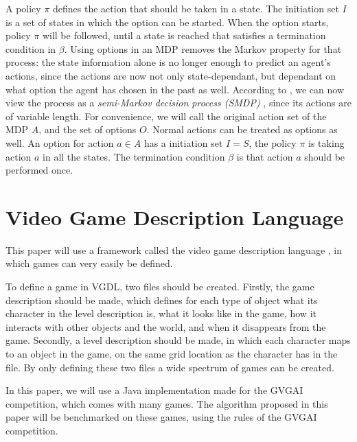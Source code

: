 A policy $\pi$ defines the action that should be taken in a state. The
initiation set $I$ is a set of states in which the option can be started. When the
option starts, policy $\pi$ will be followed, until a state is reached that
satisfies a termination condition in $\beta$. Using options in an MDP removes
the Markov property for that process: the state information alone is no longer
enough to predict an agent's actions, since the actions are now not only
state-dependant, but dependant on what option the agent has chosen in the past
as well. According to \cite{sutton1999between}, we can now view the process as
a \emph{semi-Markov decision process (SMDP)} \cite{duff1995reinforcement},
since its actions are of variable length. For convenience, we will call the
original action set of the MDP $A$, and the set of options $O$.  Normal actions
can be treated as options as well.  An option for action $a \in A$ has a
initiation set $I = S$, the policy $\pi$ is taking action $a$ in all the
states.  The termination condition $\beta$ is that action $a$ should be
performed once.

\section{Video Game Description Language}
\label{subsec:vgdl}
This paper will use a framework called the video game description
language \cite{schaul2013video}, in which games can very easily be defined.

To define a game in VGDL, two files should be created. Firstly, the game
description should be made, which defines for each type of object what its
character in the level description is, what it looks like in the game, how it
interacts with other objects and the world, and when it disappears from the
game. Secondly, a level description should be made, in which each character maps
to an object in the game, on the same grid location as the character has in the
file. By only defining these two files a wide spectrum of games can be created.

In this paper, we will use a Java implementation made for the GVGAI competition,
which comes with many games. The algorithm proposed in this paper will be
benchmarked on these games, using the rules of the GVGAI competition. 
